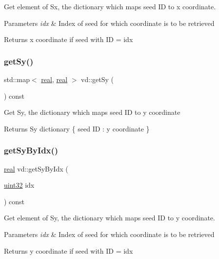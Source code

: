 Get element of Sx, the dictionary which maps seed ID to x coordinate. 
\begin{DoxyParams}{Parameters}
{\em idx} & Index of seed for which coordinate is to be retrieved \\
\hline
\end{DoxyParams}
\begin{DoxyReturn}{Returns}
x coordinate if seed with ID = idx 
\end{DoxyReturn}
\mbox{\label{classvd_a13a2a103b632b3acf41b925b5b31449e}} 
\subsubsection{\texorpdfstring{get\+Sy()}{getSy()}}
{\footnotesize\ttfamily std\+::map$<$ \mbox{\hyperlink{typedefs_8cpp_a58a0c7cf2501f4492da833421be92547}{real}}, \mbox{\hyperlink{typedefs_8cpp_a58a0c7cf2501f4492da833421be92547}{real}} $>$ vd\+::get\+Sy (\begin{DoxyParamCaption}{ }\end{DoxyParamCaption}) const}

Get Sy, the dictionary which maps seed ID to y coordinate \begin{DoxyReturn}{Returns}
Sy dictionary \{ seed ID \+: y coordinate \} 
\end{DoxyReturn}
\mbox{\label{classvd_a0f630fc80e57d3e17ab036f75afde006}} 
\subsubsection{\texorpdfstring{get\+Sy\+By\+Idx()}{getSyByIdx()}}
{\footnotesize\ttfamily \mbox{\hyperlink{typedefs_8cpp_a58a0c7cf2501f4492da833421be92547}{real}} vd\+::get\+Sy\+By\+Idx (\begin{DoxyParamCaption}\item[{\mbox{\hyperlink{typedefs_8cpp_a8ad23e2333787a214e20a58a284a5a60}{uint32}}}]{idx }\end{DoxyParamCaption}) const}

Get element of Sy, the dictionary which maps seed ID to y coordinate. 
\begin{DoxyParams}{Parameters}
{\em idx} & Index of seed for which coordinate is to be retrieved \\
\hline
\end{DoxyParams}
\begin{DoxyReturn}{Returns}
y coordinate if seed with ID = idx 
\end{DoxyReturn}
\mbox{\label{classvd_aad4ea5c045b8380f83b0490af2fee0fa}} 
